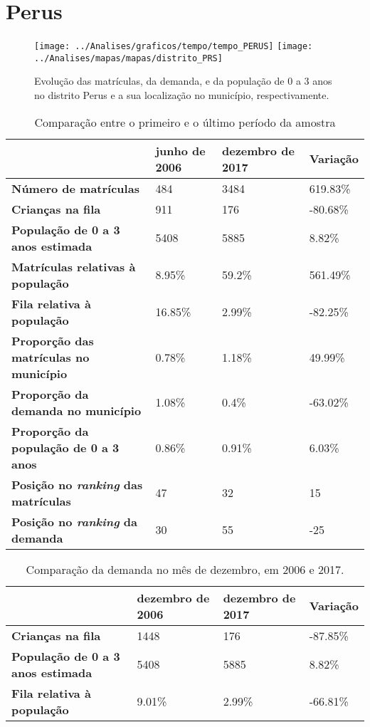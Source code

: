 \section{Perus}
\begin{figure}[H]
\centering
\texttt{[image: ../Analises/graficos/tempo/tempo\_PERUS]}
\texttt{[image: ../Analises/mapas/mapas/distrito\_PRS]}
\caption{Evolução das matrículas, da demanda, e da população de 0 a 3 anos no distrito Perus e a sua localização no município, respectivamente.}
\end{figure}
\begin{table}[H]
\begin{tabular}{l|l|l|l}
\textbf{}                                      & \textbf{junho de 2006}       & \textbf{dezembro de 2017}    & \textbf{Variação} \\ \hline
\textbf{Número de matrículas}                  & 484 & 3484 & 619.83\% \\ \hline
\textbf{Crianças na fila}                      & 911 & 176 & -80.68\% \\ \hline
\textbf{População de 0 a 3 anos estimada}      & 5408 & 5885 & 8.82\% \\ \hline
\textbf{Matrículas relativas à população}      & 8.95\% & 59.2\% & 561.49\% \\ \hline
\textbf{Fila relativa à população}             & 16.85\% & 2.99\% & -82.25\% \\ \hline
\textbf{Proporção das matrículas no município} & 0.78\% & 1.18\% & 49.99\% \\ \hline
\textbf{Proporção da demanda no município}     & 1.08\% & 0.4\% & -63.02\% \\ \hline
\textbf{Proporção da população de 0 a 3 anos}  & 0.86\% & 0.91\% & 6.03\% \\ \hline
\textbf{Posição no \textit{ranking} das matrículas}     & 47 & 32 & 15 \\ \hline
\textbf{Posição no \textit{ranking} da demanda}         & 30 & 55 & -25 \\ 
\end{tabular}
\caption{Comparação entre o primeiro e o último período da amostra}
\end{table}
\begin{table}[H]
\begin{tabular}{l|l|l|l}
\textbf{}                                 & \textbf{dezembro de 2006} & \textbf{dezembro de 2017} & \textbf{Variação} \\ \hline
\textbf{Crianças na fila}                      & 1448 & 176 & -87.85\% \\ \hline
\textbf{População de 0 a 3 anos estimada}      & 5408 & 5885 & 8.82\% \\ \hline
\textbf{Fila relativa à população}             & 9.01\% & 2.99\% & -66.81\% \\
\end{tabular}
\caption{Comparação da demanda no mês de dezembro, em 2006 e 2017.}
\end{table}
